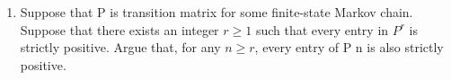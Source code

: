 \documentclass[a4paper]{article}
\begin{document}
\begin{enumerate}
\begin{proof}
\begin{align*}
            &=  \begin{pmatrix} 1 \\ 2 \\ 3 \end{pmatrix} \cdot \begin{pmatrix}
    0.46525 & 0.32405 & 0.21065 \end{pmatrix} \\
                                      &= 1.7453
   .\end{align*}
  \end{proof}
  \item Suppose that P is transition matrix for some finite-state Markov chain. Suppose that there
exists an integer $r \geq 1$ such that every entry in $P^{r}$ is strictly positive. Argue that, for any $n \geq r$,
every entry of P n is also strictly positive.


\end{enumerate}
\end{document}
